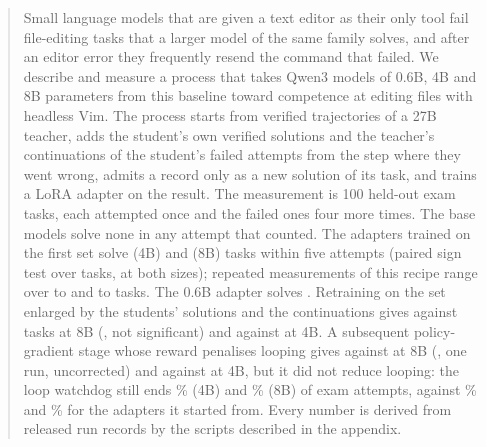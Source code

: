 \begin{abstract}
Small language models that are given a text editor as their only tool fail file-editing tasks that a larger model of the
same family solves, and after an editor error they frequently resend the command that failed. We describe and measure a
process that takes Qwen3 models of 0.6B, 4B and 8B parameters from this baseline toward competence at editing files with
headless Vim. The process starts from verified trajectories of a 27B teacher, adds the student's own verified solutions
and the teacher's continuations of the student's failed attempts from the step where they went wrong, admits a record
only as a new solution of its task, and trains a LoRA adapter on the result. The measurement is 100 held-out exam tasks,
each attempted once and the failed ones four more times. The base models solve none in any attempt that counted. The adapters trained on the
first set solve \examFourFullFive{} (4B) and \examEightFullFive{} (8B) tasks within five attempts (paired sign test over
tasks, \ptestFourFull{} at both sizes); repeated measurements of this recipe range over \roundOneFourMin{} to
\roundOneFourMax{} and \roundOneEightMin{} to \roundOneEightMax{} tasks. The 0.6B adapter solves \examZeroFullFive{}.
Retraining on the set enlarged by the students' solutions and the continuations gives \examEightRtwoFive{} against
\examEightRtworefFive{} tasks at 8B (\ptestEightRtwo{}, not significant) and \examFourRtwoFive{} against
\examFourRtworefFive{} at 4B. A subsequent policy-gradient stage whose reward penalises looping gives \examEightPgFive{}
against \examEightPgrefFive{} at 8B (\ptestEightPg{}, one run, uncorrected) and \examFourPgFive{} against
\examFourPgrefFive{} at 4B, but it did not reduce looping: the loop watchdog still ends \behaviourFourPgExamLoopPct{}\%
(4B) and \behaviourEightPgExamLoopPct{}\% (8B) of exam attempts, against \behaviourFourPgrefExamLoopPct{}\% and
\behaviourEightPgrefExamLoopPct{}\% for the adapters it started from. Every number is derived from released run records by the scripts
described in the appendix.
\end{abstract}
